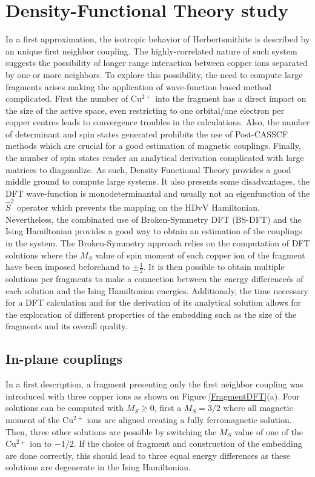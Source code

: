 \documentclass[12pt]{report}
\numberwithin{equation}{section}
\begin{document}
\section{Density-Functional Theory study}

In a first approximation, the isotropic behavior of Herbertsmithite is described by an unique first neighbor coupling. 
The highly-correlated nature of such system suggests the possibility of longer range interaction between copper ions separated by one or more neighbors. 
To explore this possibility, the need to compute large fragments arises making the application of wave-function based method complicated.
First the number of Cu$^{2+}$ into the fragment has a direct impact on the size of the active space, even restricting to one orbital/one electron per copper centres leads to convergence troubles in the calculations.
Also, the number of determinant and spin states generated prohibits the use of Post-CASSCF methods which are crucial for a good estimation of magnetic couplings.
Finally, the number of spin states render an analytical derivation complicated with large matrices to diagonalize.
As such, Density Functional Theory provides a good middle ground to compute large systems. 
It also presents some disadvantages, the DFT wave-function is monodeterminantal and usually not an eigenfunction of the $\hat{S}^2$ operator which prevents the mapping on the HDvV Hamiltonian.
Nevertheless, the combinated use of Broken-Symmetry DFT (BS-DFT) and the Ising Hamiltonian provides a good way to obtain an estimation of the couplings in the system.
The Broken-Symmetry approach relies on the computation of DFT solutions where the $M_S$ value of spin moment of each copper ion of the fragment have been imposed beforehand to $\pm \frac{1}{2}$. 
It is then possible to obtain multiple solutions per fragments to make a connection between the energy differenceés of each solution and the Ising Hamiltonian energies.
Additionaly, the time necessary for a DFT calculation and for the derivation of its analytical solution allows for the exploration of different properties of the embedding such as the size of the fragments and its overall quality.


\subsection{In-plane couplings}

In a first description, a fragment presenting only the first neighbor coupling was introduced with three copper ions as shown on Figure \ref{FragmentDFT}(a).
Four solutions can be computed with $M_S$$\ge$$0$, first a $M_S=3/2$ where all magnetic moment of the Cu$^{2+}$ ions are aligned creating a fully ferromagnetic solution. 
Then, three other solutions are possible by switching the $M_S$ value of one of the Cu$^{2+}$ ion to $-1/2$. 
If the choice of fragment and construction of the embedding are done correctly, this should lead to three equal energy differences as these solutions are degenerate in the Ising Hamiltonian.
\end{document}
